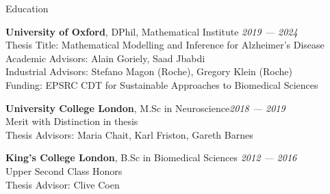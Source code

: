 \begin{rSection}{Education}

{\bf University of Oxford}, DPhil, Mathematical Institute  \hfill {\em 2019 — 2024} \\
Thesis Title: Mathematical Modelling and Inference for Alzheimer's Disease \\
Academic Advisors: Alain Goriely, Saad Jbabdi \\
Industrial Advisors: Stefano Magon (Roche), Gregory Klein (Roche)\\
Funding: EPSRC CDT for Sustainable Approaches to Biomedical Sciences 

{\bf University College London},  M.Sc in Neuroscience\hfill {\em 2018 — 2019} \\ 
Merit with Distinction in thesis \\
Thesis Advisors: Maria Chait, Karl Friston, Gareth Barnes 

{\bf King's College London}, B.Sc in Biomedical Sciences \hfill {\em 2012 — 2016} \\ 
Upper Second Class Honors \\
Thesis Advisor: Clive Coen

\end{rSection}

